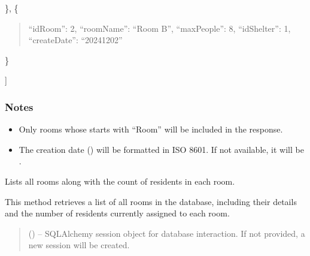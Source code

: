 \documentclass[letterpaper,10pt,english]{sphinxmanual}
\begin{document}
\begin{fulllineitems}
\begin{fulllineitems}
\begin{description}
\begin{description}
\begin{description}
\end{description}

\sphinxAtStartPar
\},
\{
\begin{quote}

\sphinxAtStartPar
“idRoom”: 2,
“roomName”: “Room B”,
“maxPeople”: 8,
“idShelter”: 1,
“createDate”: “2024\sphinxhyphen{}12\sphinxhyphen{}02”
\end{quote}

\sphinxAtStartPar
\}

\end{description}

\sphinxAtStartPar
{]}

\end{description}
\subsubsection*{Notes}
\begin{itemize}
\item {} 
\sphinxAtStartPar
Only rooms whose  starts with “Room” will be included in the response.

\item {} 
\sphinxAtStartPar
The creation date () will be formatted in ISO 8601. If not available, it will be .

\end{itemize}

\end{fulllineitems}


\begin{fulllineitems}
\label{\detokenize{app.controllers:app.controllers.room_controller.RoomController.list_rooms_with_resident_count}}
\pysigstartsignatures
\pysiglinewithargsret
{}
{}
{}
\pysigstopsignatures
\sphinxAtStartPar
Lists all rooms along with the count of residents in each room.

\sphinxAtStartPar
This method retrieves a list of all rooms in the database, including their details
and the number of residents currently assigned to each room.
\begin{quote}\begin{description}
\sphinxAtStartPar
{} (\sphinxstyleliteralemphasis{\sphinxupquote{, }}) – SQLAlchemy session object for database interaction.
If not provided, a new session will be created.


\end{description}
\end{quote}
\end{fulllineitems}
\end{fulllineitems}
\end{document}
